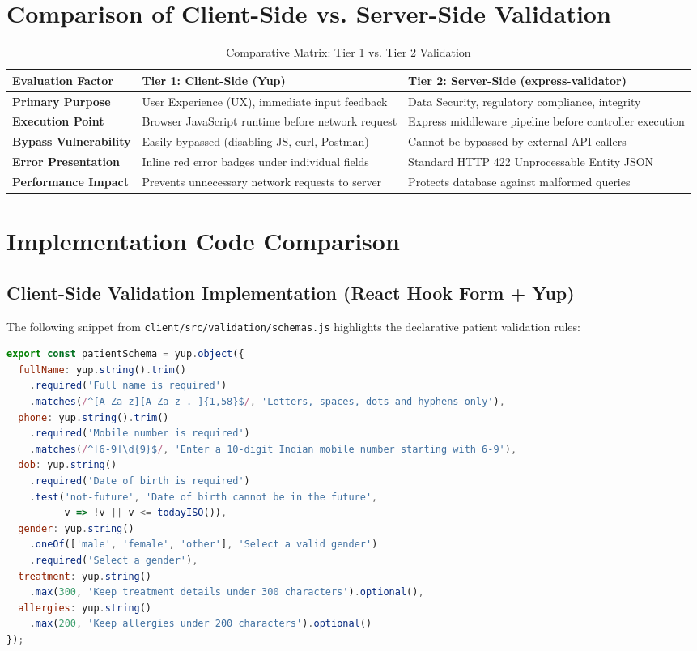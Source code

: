 \documentclass[12pt,a4paper,oneside]{report}
\begin{document}
\section{Comparison of Client-Side vs. Server-Side Validation}
\begin{table}[h!]
\centering
\caption{Comparative Matrix: Tier 1 vs. Tier 2 Validation}
\label{tab:validation_comparison}
\begin{tabularx}{\textwidth}{p{3.5cm} X X}
\toprule
\textbf{Evaluation Factor} & \textbf{Tier 1: Client-Side (Yup)} & \textbf{Tier 2: Server-Side (express-validator)} \\
\midrule
\textbf{Primary Purpose} & User Experience (UX), immediate input feedback & Data Security, regulatory compliance, integrity \\
\textbf{Execution Point} & Browser JavaScript runtime before network request & Express middleware pipeline before controller execution \\
\textbf{Bypass Vulnerability} & Easily bypassed (disabling JS, curl, Postman) & Cannot be bypassed by external API callers \\
\textbf{Error Presentation} & Inline red error badges under individual fields & Standard HTTP 422 Unprocessable Entity JSON \\
\textbf{Performance Impact} & Prevents unnecessary network requests to server & Protects database against malformed queries \\
\bottomrule
\end{tabularx}
\end{table}

\section{Implementation Code Comparison}

\subsection{Client-Side Validation Implementation (React Hook Form + Yup)}
The following snippet from \texttt{client/src/validation/schemas.js} highlights the declarative patient validation rules:

\begin{lstlisting}[language=JavaScript, caption={Client-Side Yup Patient Validation Schema}]
export const patientSchema = yup.object({
  fullName: yup.string().trim()
    .required('Full name is required')
    .matches(/^[A-Za-z][A-Za-z .-]{1,58}$/, 'Letters, spaces, dots and hyphens only'),
  phone: yup.string().trim()
    .required('Mobile number is required')
    .matches(/^[6-9]\d{9}$/, 'Enter a 10-digit Indian mobile number starting with 6-9'),
  dob: yup.string()
    .required('Date of birth is required')
    .test('not-future', 'Date of birth cannot be in the future', 
          v => !v || v <= todayISO()),
  gender: yup.string()
    .oneOf(['male', 'female', 'other'], 'Select a valid gender')
    .required('Select a gender'),
  treatment: yup.string()
    .max(300, 'Keep treatment details under 300 characters').optional(),
  allergies: yup.string()
    .max(200, 'Keep allergies under 200 characters').optional()
});
\end{lstlisting}
\end{document}
